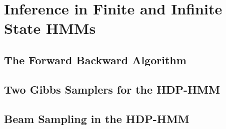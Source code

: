 \section{Inference in Finite and Infinite State HMMs}
\label{sec:inference-hdp-hmm}

\subsection{The Forward Backward Algorithm}
\label{sec:forw-backw-algor-1}

\subsection{Two Gibbs Samplers for the HDP-HMM}

\subsection{Beam Sampling in the HDP-HMM}
